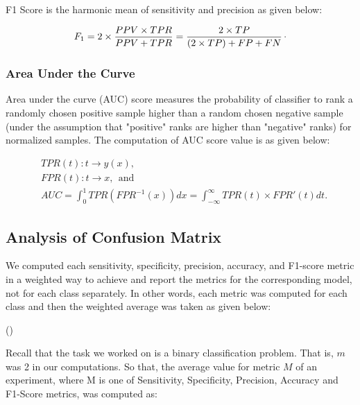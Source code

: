 F1 Score is the harmonic mean of sensitivity and precision as given below:

\begin{equation}
	\label{eq:F1_Score}
	F_{1} = 2 \times \frac{PPV \times TPR}{PPV + TPR} = \frac{2 \times TP}{(2 \times TP) + FP + FN}\raisepunct{.}
\end{equation}


\subsubsection*{Area Under the Curve}

Area under the curve (AUC) score measures the probability of classifier to rank a randomly chosen positive sample higher than a random chosen negative sample (under the assumption that "positive" ranks are higher than "negative" ranks) for normalized samples. The computation of AUC score value is as given below:

\begin{align}
	\label{eq:AUC_Score}
	\nonumber
	& TPR(t) : t \rightarrow y \left ( x \right ), \\
	\nonumber
	& FPR(t) : t \rightarrow x, \:\: \text{and} \\ 
	& AUC = \int_{0}^{1} TPR \left ( FPR^{-1}\left ( x \right ) \right ) dx = \int_{-\infty}^{\infty} TPR \left ( t \right ) \times {FPR}' \left ( t \right ) dt.
\end{align}


\subsection{Analysis of Confusion Matrix}

We computed each sensitivity, specificity, precision, accuracy, and F1-score metric in a weighted way to achieve and report the metrics for the corresponding model, not for each class separately. In other words, each metric was computed for each class and then the weighted average was taken as given below:

\be
\label{eq:weighted_avg_metric}
 {()} \:\: 
\ee

Recall that the task we worked on is a binary classification problem. That is, $m$ was 2 in our computations. So that, the average value for metric $M$ of an experiment, where M is one of Sensitivity, Specificity, Precision, Accuracy and F1-Score metrics, was computed as:

